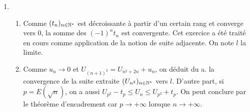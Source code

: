\begin{enumerate}
\item
\begin{enumerate}
\item Comme $(t_{n})_{n\in \mathbb{N}^{*}}$ est d{\'e}croissante {\`a}
partir d'un certain rang et converge vers 0, la somme des
$(-1)^{n}t_{n}$ est convergente. Cet exercice a {\'e}t{\'e} trait{\'e} en
cours comme application de la notion de suite adjacente. On note
$l$ la limite$.$

\item Comme $u_{n}\rightarrow 0$ et $U_{(n+1)^{2}}=U_{n^{2}+2n}+u_{n}$,
on d{\'e}duit du a. la convergence de la suite extraite
$(U_{n^{2}})_{n\in
\mathbb{N}^{*}}$ vers $l$. D'autre part, si $p=E(\sqrt{n})$, on a aussi $%
U_{p^{2}}-t_{p}\leq U_{n}\leq U_{p^{2}}+t_{p}.$ On peut conclure
par le
th{\'e}or{\`e}me d'encadrement car $p\rightarrow +\infty $ lorsque $%
n\rightarrow +\infty $.
\end{enumerate}
\end{enumerate}
